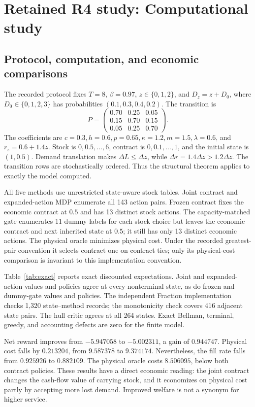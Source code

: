 \section{Retained R4 study: Computational study}\label{sec:experiments}
\subsection{Protocol, computation, and economic comparisons}
The recorded protocol fixes $T=8$, $\beta=0.97$, $z\in\{0,1,2\}$, and $D_z=z+D_0$, where $D_0\in\{0,1,2,3\}$ has probabilities $(0.1,0.3,0.4,0.2)$. The transition is
\[
 P=\begin{pmatrix}0.70&0.25&0.05\\0.15&0.70&0.15\\0.05&0.25&0.70\end{pmatrix}.
\]
The coefficients are $c=0.3,h=0.6,p=0.65,\kappa=1.2,m=1.5,\lambda=0.6$, and $r_z=0.6+1.4z$. Stock is $0,0.5,\ldots,6$, contract is $0,0.1,\ldots,1$, and the initial state is $(1,0.5)$. Demand translation makes $\Delta L\leq\Delta z$, while $\Delta r=1.4\Delta z>1.2\Delta z$. The transition rows are stochastically ordered. Thus the structural theorem applies to exactly the model computed.

All five methods use unrestricted state-aware stock tables. Joint contract and expanded-action MDP enumerate all 143 action pairs. Frozen contract fixes the economic contract at $0.5$ and has 13 distinct stock actions. The capacity-matched gate enumerates 11 dummy labels for each stock choice but leaves the economic contract and next inherited state at $0.5$; it still has only 13 distinct economic actions. The physical oracle minimizes physical cost. Under the recorded greatest-pair convention it selects contract one on contract ties; only its physical-cost comparison is invariant to this implementation convention.

Table~\ref{tab:exact} reports exact discounted expectations. Joint and expanded-action values and policies agree at every nonterminal state, as do frozen and dummy-gate values and policies. The independent Fraction implementation checks 1,320 state--method records; the monotonicity check covers 416 adjacent state pairs. The hull critic agrees at all 264 states. Exact Bellman, terminal, greedy, and accounting defects are zero for the finite model.

Net reward improves from $-5.947058$ to $-5.002311$, a gain of $0.944747$. Physical cost falls by $0.213204$, from $9.587378$ to $9.374174$. Nevertheless, the fill rate falls from $0.925926$ to $0.882109$. The physical oracle costs $8.506095$, below both contract policies. These results have a direct economic reading: the joint contract changes the cash-flow value of carrying stock, and it economizes on physical cost partly by accepting more lost demand. Improved welfare is not a synonym for higher service.

